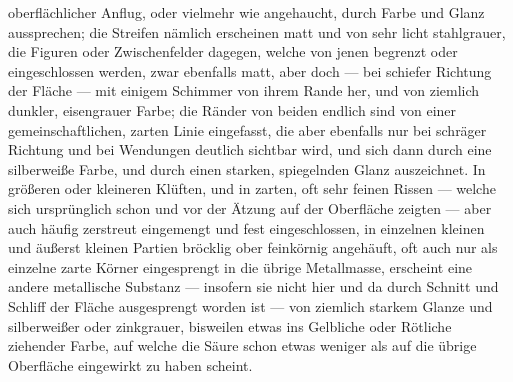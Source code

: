 \documentclass[a4paper, 11pt, oneside, german]{article}
\begin{document}
oberflächlicher Anflug, oder vielmehr wie angehaucht, durch Farbe und Glanz aussprechen; die Streifen nämlich erscheinen matt und von sehr licht stahlgrauer, die Figuren oder Zwischenfelder dagegen, welche von jenen begrenzt oder eingeschlossen werden, zwar ebenfalls matt, aber doch --- bei schiefer Richtung der Fläche --- mit einigem Schimmer von ihrem Rande her, und von ziemlich dunkler, eisengrauer Farbe; die Ränder von beiden endlich sind von einer gemeinschaftlichen, zarten Linie eingefasst, die aber ebenfalls nur bei schräger Richtung und bei Wendungen deutlich sichtbar wird, und sich dann durch eine silberweiße Farbe, und durch einen starken, spiegelnden Glanz auszeichnet. In größeren oder kleineren Klüften, und in zarten, oft sehr feinen Rissen --- welche sich ursprünglich schon und vor der Ätzung auf der Oberfläche zeigten --- aber auch häufig zerstreut eingemengt und fest eingeschlossen, in einzelnen kleinen und äußerst kleinen Partien bröcklig ober feinkörnig angehäuft, oft auch nur als einzelne zarte Körner eingesprengt in die übrige Metallmasse, erscheint eine andere metallische Substanz --- insofern sie nicht hier und da durch Schnitt und Schliff der Fläche ausgesprengt worden ist --- von ziemlich starkem Glanze und silberweißer oder zinkgrauer, bisweilen etwas ins Gelbliche oder Rötliche ziehender Farbe, auf welche die Säure schon etwas weniger als auf die übrige Oberfläche eingewirkt zu haben scheint.
\end{document}
